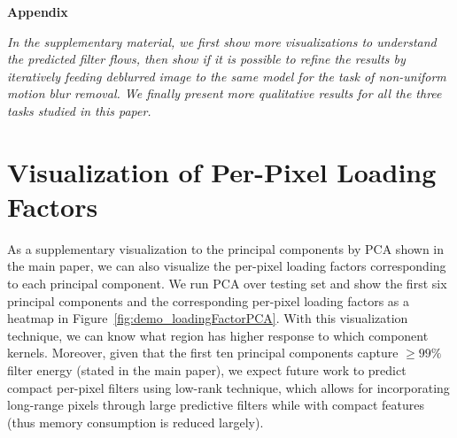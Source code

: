 \setcounter{section}{0}


\begin{center}
 {\large \textbf{Appendix}}
\end{center}



\emph{
In the supplementary material,
we first show more visualizations to understand the predicted filter flows,
then show if it is possible to refine the results
by iteratively feeding deblurred image to the same model
for the task of non-uniform motion blur removal.
We finally present more qualitative results for all the three tasks studied in this paper.
}





\section{Visualization of Per-Pixel Loading Factors}

As a supplementary visualization to the principal components by PCA shown in the main paper,
we can also visualize the per-pixel loading factors corresponding to each principal component.
We run PCA over testing set and show the first six principal components and the corresponding
per-pixel loading factors as a heatmap in Figure~\ref{fig:demo_loadingFactorPCA}.
With this visualization technique,
we can know what region has higher response to which component kernels.
Moreover,
given that the first ten principal components capture $\ge 99\%$ filter
energy (stated in the main paper),
we expect future work to predict compact per-pixel filters using low-rank technique,
which allows for incorporating long-range pixels through large predictive filters while
with compact features (thus memory consumption is reduced largely).





